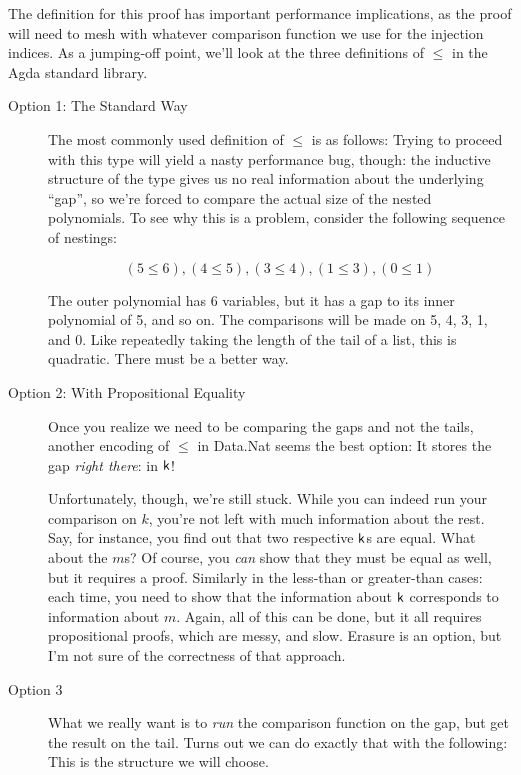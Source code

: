 \documentclass[draft, twocolumn]{article}
\theoremstyle{definition}
\theoremstyle{definition}
\begin{document}
The definition for this proof has important performance implications, as the
proof will need to mesh with whatever comparison function we use for the
injection indices. As a jumping-off point, we'll look at the three definitions
of \(\leq\) in the Agda standard library\cite{danielsson_agda_2018}.
\begin{description}
  \item[Option 1: The Standard Way] The most commonly used definition of
    \(\leq\) is as follows:
    Trying to proceed with this type will yield a nasty performance bug, though:
    the inductive structure of the type gives us no real information about the
    underlying ``gap'', so we're forced to compare the actual size of the
    nested polynomials. To see why this is a problem, consider the following
    sequence of nestings:

    \[ (5 ≤ 6), (4 ≤ 5), (3 ≤ 4), (1 ≤ 3), (0 ≤ 1) \]

    The outer polynomial has 6 variables, but it has a gap to its inner
    polynomial of 5, and so on. The comparisons will be made on 5, 4, 3, 1, and
    0. Like repeatedly taking the length of the tail of a list, this is
    quadratic. There must be a better way.
  \item[Option 2: With Propositional Equality] Once you realize we need to be
    comparing the gaps and not the tails, another encoding of \(\leq\) in
    Data.Nat seems the best option:
    It stores the gap \emph{right there}: in \(\AgdaField{k}\)!

    Unfortunately, though, we're still stuck. While you can indeed run your
    comparison on \(k\), you're not left with much information about the rest.
    Say, for instance, you find out that two respective \(\AgdaField{k}\)s are
    equal. What about the \(m\)s? Of course, you \emph{can} show that they must
    be equal as well, but it requires a proof. Similarly in the less-than or
    greater-than cases: each time, you need to show that the information about
    \(\AgdaField{k}\) corresponds to information about \(m\). Again, all of this
    can be done, but it all requires propositional proofs, which are messy, and
    slow. Erasure is an option, but I'm not sure of the correctness of that
    approach.
  \item[Option 3] What we really want is to \emph{run} the comparison function
    on the gap, but get the result on the tail. Turns out we can do exactly that
    with the following:
    This is the structure we will choose.
\end{description}
\end{document}
